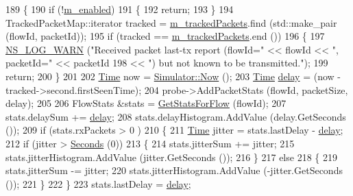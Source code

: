 \begin{DoxyCode}
189 \{
190   \textcolor{keywordflow}{if} (!\hyperlink{classns3_1_1FlowMonitor_a26ecae1b883d6625091b07e2698f0d45}{m\_enabled})
191     \{
192       \textcolor{keywordflow}{return};
193     \}
194   TrackedPacketMap::iterator tracked = \hyperlink{classns3_1_1FlowMonitor_ab4f63ca5c2a927337870110fa8233bce}{m\_trackedPackets}.find (std::make\_pair (flowId, 
      packetId));
195   \textcolor{keywordflow}{if} (tracked == \hyperlink{classns3_1_1FlowMonitor_ab4f63ca5c2a927337870110fa8233bce}{m\_trackedPackets}.end ())
196     \{
197       \hyperlink{group__logging_gade7208b4009cdf0e25783cd26766f559}{NS\_LOG\_WARN} (\textcolor{stringliteral}{"Received packet last-tx report (flowId="} << flowId << \textcolor{stringliteral}{", packetId="} << 
      packetId
198                                                              << \textcolor{stringliteral}{") but not known to be transmitted."});
199       \textcolor{keywordflow}{return};
200     \}
201 
202   \hyperlink{namespacens3_1_1TracedValueCallback_a7ffd3e7c142ffe7c8a1d2db9b8de38ec}{Time} now = \hyperlink{classns3_1_1Simulator_ac3178fa975b419f7875e7105be122800}{Simulator::Now} ();
203   \hyperlink{namespacens3_1_1TracedValueCallback_a7ffd3e7c142ffe7c8a1d2db9b8de38ec}{Time} \hyperlink{lte_2model_2fading-traces_2fading__trace__generator_8m_a7964e6aa8f61a9d28973c8267a606ad8}{delay} = (now - tracked->second.firstSeenTime);
204   probe->AddPacketStats (flowId, packetSize, delay);
205 
206   FlowStats &stats = \hyperlink{classns3_1_1FlowMonitor_a029346e25b6b7c0e70fe269e27739a7c}{GetStatsForFlow} (flowId);
207   stats.delaySum += \hyperlink{lte_2model_2fading-traces_2fading__trace__generator_8m_a7964e6aa8f61a9d28973c8267a606ad8}{delay};
208   stats.delayHistogram.AddValue (delay.GetSeconds ());
209   \textcolor{keywordflow}{if} (stats.rxPackets > 0 )
210     \{
211       \hyperlink{namespacens3_1_1TracedValueCallback_a7ffd3e7c142ffe7c8a1d2db9b8de38ec}{Time} jitter = stats.lastDelay - \hyperlink{lte_2model_2fading-traces_2fading__trace__generator_8m_a7964e6aa8f61a9d28973c8267a606ad8}{delay};
212       \textcolor{keywordflow}{if} (jitter > \hyperlink{group__timecivil_ga33c34b816f8ff6628e33d5c8e9713b9e}{Seconds} (0))
213         \{
214           stats.jitterSum += jitter;
215           stats.jitterHistogram.AddValue (jitter.GetSeconds ());
216         \}
217       \textcolor{keywordflow}{else} 
218         \{
219           stats.jitterSum -= jitter;
220           stats.jitterHistogram.AddValue (-jitter.GetSeconds ());
221         \}
222     \}
223   stats.lastDelay = \hyperlink{lte_2model_2fading-traces_2fading__trace__generator_8m_a7964e6aa8f61a9d28973c8267a606ad8}{delay};

\end{DoxyCode}
